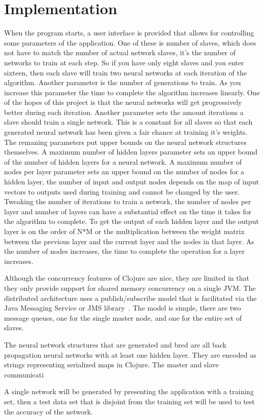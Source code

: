 \section{Implementation}
When the program starts, a user interface is provided that allows for controlling some parameters of the application. One of these is number of slaves, which does not have to match the number of actual network slaves, it's the number of networks to train at each step. So if you have only eight slaves and you enter sixteen, then each slave will train two neural networks at each iteration of the algorithm. Another parameter is the number of generations to train. As you increase this parameter the time to complete the algorithm increases linearly. One of the hopes of this project is that the neural networks will get progressively better during each iteration. Another parameter sets the amount iterations a slave should train a single network. This is a constant for all slaves so that each generated neural network has been given a fair chance at training it's weights. The remaning parameters put upper bounds on the neural network structures themselves. A maximum number of hidden layers parameter sets an upper bound of the number of hidden layers for a neural network. A maximum number of nodes per layer parameter sets an upper bound on the number of nodes for a hidden layer, the number of input and output nodes depends on the map of input vectors to outputs used during training and cannot be changed by the user. Tweaking the number of iterations to train a network, the number of nodes per layer and number of layers can have a substantial effect on the time it takes for the algorithm to complete. To get the output of each hidden layer and the output layer is on the order of N*M or the multiplication between the weight matrix between the previous layer and the current layer and the nodes in that layer. As the number of nodes increases, the time to complete the operation for a layer increases.

Although the concurrency features of Clojure are nice, they are limited in that they only provide support for shared memory concurrency on a single JVM.  The distributed architecture uses a publish/subscribe model that is facilitated via the Java Messaging Service or JMS library~\cite{jms}. The model is simple, there are two message queues, one for the single master node, and one for the entire set of slaves. 

The neural network structures that are generated and bred are all back propagation neural networks with at least one hidden layer. They are encoded as strings representing serialized maps in Clojure. The master and slave communicati


A single network will be generated by presenting the application with a training set, then a test data set that is disjoint from the training set will be used to test the accuracy of the network.  